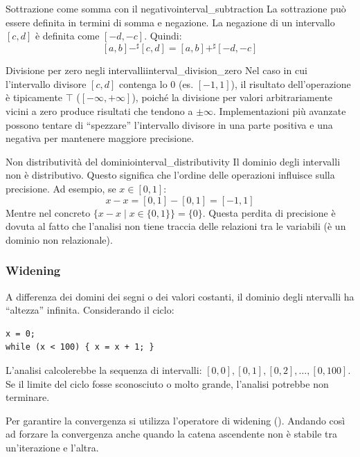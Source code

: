 \begin{nota}{Sottrazione come somma con il negativo}{interval_subtraction}
    La sottrazione può essere definita in termini di somma e negazione.
    La negazione di un intervallo $[c, d]$ è definita come $[-d, -c]$.
    Quindi:
    \[
    [a, b] -^\sharp [c, d] = [a, b] +^\sharp [-d, -c]
    \]
\end{nota}
\begin{nota}{Divisione per zero negli intervalli}{interval_division_zero}
    Nel caso in cui l'intervallo divisore $[c, d]$ contenga lo $0$
    (es. $[-1, 1]$), il risultato dell'operazione è tipicamente $\top$
    ($[-\infty, +\infty]$), poiché la divisione per valori arbitrariamente
    vicini a zero produce risultati che tendono a $\pm\infty$.
    Implementazioni più avanzate possono tentare di ``spezzare'' l'intervallo
    divisore in una parte positiva e una negativa per mantenere maggiore
    precisione.
\end{nota}

\begin{nota}{Non distributività del dominio}{interval_distributivity}
    Il dominio degli intervalli non è distributivo. Questo significa che
    l'ordine delle operazioni influisce sulla precisione.
    Ad esempio, se $x \in [0, 1]$:
    \[ x - x = [0, 1] - [0, 1] = [-1, 1] \]
    Mentre nel concreto $\{x - x \mid x \in \{0, 1\}\} = \{0\}$.
    Questa perdita di precisione è dovuta al fatto che l'analisi non tiene
    traccia delle relazioni tra le variabili (è un dominio non relazionale).
\end{nota}

\subsubsection{Widening}

A differenza dei domini dei segni o dei valori costanti, il dominio degli
ntervalli ha ``altezza'' infinita. Considerando il ciclo:
\begin{verbatim}
x = 0;
while (x < 100) { x = x + 1; }
\end{verbatim}
L'analisi calcolerebbe la sequenza di intervalli:
$[0,0], [0,1], [0,2], \dots, [0,100]$.
Se il limite del ciclo fosse sconosciuto o molto grande, l'analisi potrebbe
non terminare.

Per garantire la convergenza si utilizza l'operatore di widening
().
Andando così ad forzare la convergenza anche quando la catena ascendente
non è stabile tra un'iterazione e l'altra.

